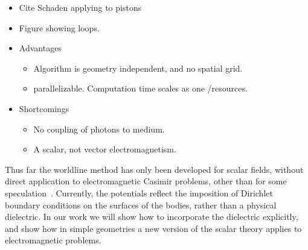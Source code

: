 \begin{itemize}
\item Cite Schaden applying to pistons\cite{Schaden2009}
\item Figure showing loops.  
\item Advantages
  \begin{itemize}
  \item Algorithm is geometry independent, and no spatial grid.
  \item parallelizable.  Computation time scales as one /resources.  
  \end{itemize}

\item Shortcomings
\begin{itemize}
  \item No coupling of photons to medium.
  \item A scalar, not vector electromagnetism.
\end{itemize}
  
\end{itemize}


Thus far the worldline method has only been developed for scalar fields, 
without direct application to electromagnetic Casimir problems, 
other than for some speculation~\cite{Aehlig2011}.
  Currently, the potentials reflect the imposition of Dirichlet boundary 
conditions on the surfaces of the bodies, rather than a physical dielectric.
   In our work we will show how to incorporate the dielectric explicitly, 
and show how in simple geometries a new version of the scalar theory applies
 to electromagnetic problems.  

